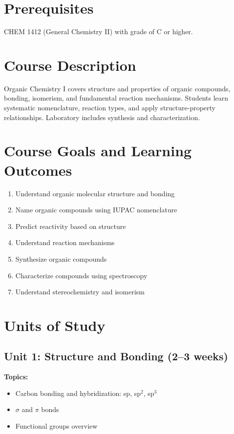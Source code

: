\documentclass[12pt,oneside]{book}
\begin{document}
\section{Prerequisites}

CHEM 1412 (General Chemistry II) with grade of C or higher.

\section{Course Description}

Organic Chemistry I covers structure and properties of organic compounds, bonding, isomerism, and fundamental reaction mechanisms. Students learn systematic nomenclature, reaction types, and apply structure-property relationships. Laboratory includes synthesis and characterization.

\section{Course Goals and Learning Outcomes}

\begin{enumerate}
    \item Understand organic molecular structure and bonding
    \item Name organic compounds using IUPAC nomenclature
    \item Predict reactivity based on structure
    \item Understand reaction mechanisms
    \item Synthesize organic compounds
    \item Characterize compounds using spectroscopy
    \item Understand stereochemistry and isomerism
\end{enumerate}

\section{Units of Study}

\subsection{Unit 1: Structure and Bonding (2--3 weeks)}

\textbf{Topics:}
\begin{itemize}
    \item Carbon bonding and hybridization: sp, sp$^2$, sp$^3$
    \item $\sigma$ and $\pi$ bonds
    \item Functional groups overview
\end{itemize}
\end{document}
